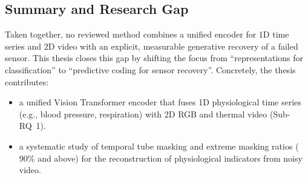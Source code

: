 \subsection{Summary and Research Gap}
Taken together, no reviewed method combines a unified encoder for 1D time series
and 2D video with an explicit, measurable generative recovery of a failed
sensor. This thesis closes this gap by shifting the focus from
\enquote{representations for classification} to \enquote{predictive coding for
sensor recovery}. Concretely, the thesis contributes:
\begin{itemize}
    \item a unified Vision Transformer encoder that fuses 1D physiological
    time series (e.g., blood pressure, respiration) with 2D RGB and thermal video
    (Sub-RQ~1).
    \item a systematic study of temporal tube masking and extreme masking
    ratios ($90\%$ and above) for the reconstruction of physiological
    indicators from noisy video.
\end{itemize}

